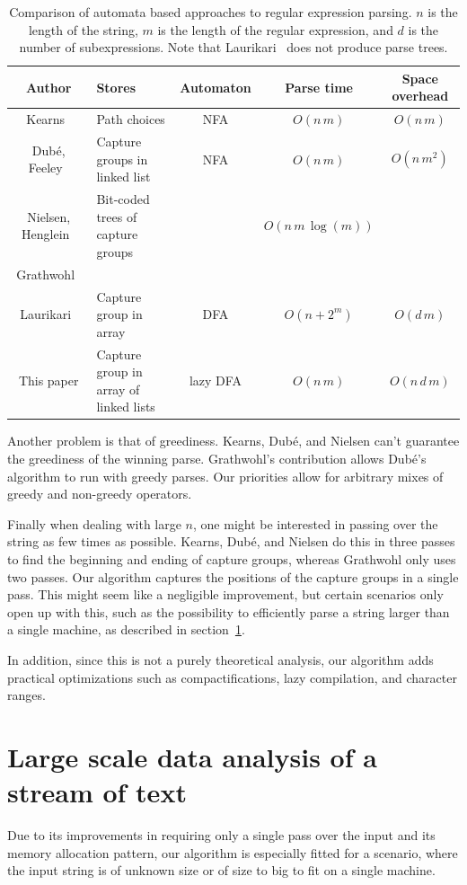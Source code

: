 \documentclass[11pt,a4paper,twoside,openright]{Thesis}
\theoremstyle{definition}
\newcommand{\Secref}[1]{section~\ref{sec:#1}}
\begin{document}
\begin{table}
\begin{tabular}{c|>{\centering}m{3cm}ccc}
  Author & Stores & Automaton & Parse time & Space overhead \\
  \hline
  \hline
  Kearns~\cite{Kear91a}& Path choices & NFA & $O(n\,m)$ & $O(n\, m)$ \\
  \hline
  Dub\'e, Feeley~\cite{Dube00a}& Capture groups in linked
  list & NFA & $O(n\,m)$ & $O(n\, m^2)$\\
  Nielsen, Henglein~\cite{Niel11a} & Bit-coded trees of capture groups  & & $O(n\, m\, \log(m))$ \\
  Grathwohl~\cite{Grat13a} \\
  \hline
  Laurikari~\cite{Laur00a}& Capture group in array & DFA &
  $O(n+2^m)$ & $O(d\, m)$\\
  This paper & Capture group in array of linked lists & lazy DFA
  & $O(n\, m)$ & $O(n\, d\, m)$ \\
\end{tabular}
\caption{Comparison of automata based approaches to regular expression
parsing. $n$ is the length of the string, $m$ is the length of the regular
expression, and $d$ is the number of subexpressions. Note that
Laurikari~\cite{Laur00a} does not produce parse trees.}
\end{table}

Another problem is that of greediness. Kearns, Dub\'e, and Nielsen can't
guarantee the greediness of the winning parse. Grathwohl's contribution
allows Dub\'e's algorithm to run with greedy parses. Our priorities allow for
arbitrary mixes of greedy and non-greedy operators.

Finally when dealing with large $n$, one might be interested in passing over
the string as few times as possible. Kearns, Dub\'e, and Nielsen do this in
three passes to find the beginning and ending of capture groups, whereas
Grathwohl only uses two passes. Our algorithm captures the positions of the
capture groups in a single pass. This might seem like a negligible 
improvement, but certain scenarios only open up with this, such as the 
possibility to efficiently parse a string larger than a single machine, as 
described in \Secref{stream}.

In addition, since this is not a purely theoretical analysis, our algorithm
adds practical optimizations such as compactifications, lazy compilation, and
character ranges.

\section{Large scale data analysis of a stream of text}\label{sec:stream}
Due to its improvements in requiring only a single pass over the input and
its memory allocation pattern, our algorithm is especially fitted for a
scenario, where the input string is of unknown size or of size to big to fit
on a single machine.
\end{document}

